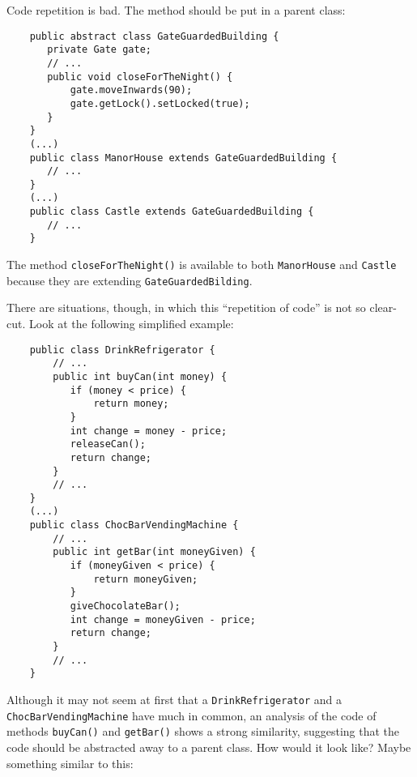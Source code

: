 Code repetition is bad. The method should be put in a parent class: 

\begin{verbatim}
    public abstract class GateGuardedBuilding {
       private Gate gate;
       // ...
       public void closeForTheNight() {
           gate.moveInwards(90);
           gate.getLock().setLocked(true);
       }
    }
    (...)
    public class ManorHouse extends GateGuardedBuilding {
       // ...
    }
    (...)
    public class Castle extends GateGuardedBuilding {
       // ...
    }       
\end{verbatim}

The method \verb+closeForTheNight()+ is available to both
\verb+ManorHouse+ and \verb+Castle+ because they are extending
\verb+GateGuardedBilding+. 

There are situations, though, in which this ``repetition of code'' is not so clear-cut. Look at the
following simplified example:  

\begin{verbatim}
    public class DrinkRefrigerator {
        // ...
        public int buyCan(int money) {
           if (money < price) {
               return money;
           } 
           int change = money - price;
           releaseCan();
           return change;
        }
        // ...
    }
    (...)
    public class ChocBarVendingMachine {
        // ...
        public int getBar(int moneyGiven) {
           if (moneyGiven < price) {
               return moneyGiven;
           } 
           giveChocolateBar();
           int change = moneyGiven - price;
           return change;
        }
        // ...
    }
\end{verbatim}

Although it may not seem at first that a \verb+DrinkRefrigerator+ and
a \verb+ChocBarVendingMachine+ have much in common, an analysis of the
code of methods \verb+buyCan()+ and \verb+getBar()+ shows a strong
similarity, suggesting that the code should be abstracted away to a
parent class. How would it look like? Maybe something similar to this: 

